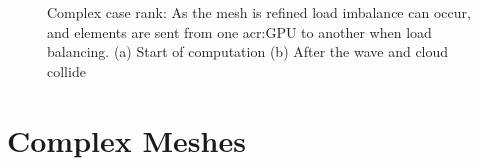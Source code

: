 \begin{figure}[H]
	\centering
	\hfill
	\caption{Complex case rank: As the mesh is refined load imbalance can occur, and elements are sent from one \acrshort{acr:GPU} to another when load balancing. (a) Start of computation (b) After the wave and cloud collide}\label{fig:cloud_rank}
\end{figure}

\section{Complex Meshes}\label{section:results:complex_meshes}


